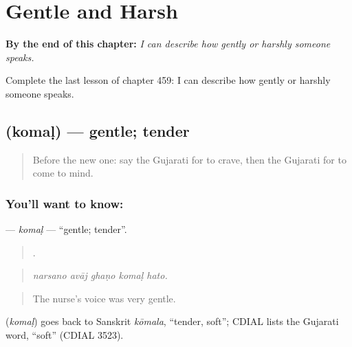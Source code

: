 
\chapter{Gentle and Harsh}
\label{ch:gu-gentle-and-harsh}

\begin{chapteropening}
\textbf{By the end of this chapter:} \emph{I can describe how gently or harshly someone speaks.}

Complete the last lesson of chapter 459: I can describe how gently or harshly someone speaks.
\end{chapteropening}

\section[\texorpdfstring{\gu{કોમળ} (komaḷ)}{કોમળ (komaḷ)}]{ (komaḷ) — gentle; tender}

\label{lesson:GU-C459-komal}



\begin{quote}
Before the new one: say the Gujarati for to crave, then the Gujarati for to come to mind.
\end{quote}

\subsection*{You'll want to know: }
\textbf{} — \emph{komaḷ} — \textquotedblleft{}gentle; tender\textquotedblright{}.

\begin{quote}
    .
\end{quote}

\begin{quote}
\emph{narsano avāj ghaṇo komaḷ hato.}
\end{quote}

\begin{quote}
The nurse's voice was very gentle.
\end{quote}

\begin{cousinweb}
\textbf{} (\emph{komaḷ}) goes back to Sanskrit \emph{kōmala}, \textquotedblleft{}tender, soft\textquotedblright{}; CDIAL lists the Gujarati word, \textquotedblleft{}soft\textquotedblright{} (CDIAL 3523).
\end{cousinweb}

